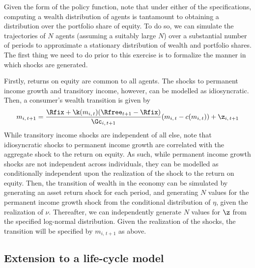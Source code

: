 Given the form of the policy function, note that under either of the specifications, computing a wealth distribution of agents is tantamount to obtaining a distribution over the portfolio share of equity. To do so, we can simulate the trajectories of $N$ agents (assuming a suitably large $N$) over a substantial number of periods to approximate a stationary distribution of wealth and portfolio shares. The first thing we need to do prior to this exercise is to formalize the manner in which shocks are generated.

Firstly, returns on equity are common to all agents. The shocks to permanent income growth and transitory income, however, can be modelled as idiosyncratic. Then, a consumer's wealth transition is given by
\[
m_{i,\,t+1} = \frac{\Rfix + \k(m_{i,\,t})(\Rfree_{t+1} - \Rfix)}{\Gc_{i,\,t+1}}(m_{i,\,t} - c(m_{i,\,t})) + \z_{i,\,t+1}
\]
While transitory income shocks are independent of all else, note that idiosyncratic shocks to permanent income growth are correlated with the aggregate shock to the return on equity. As such, while permanent income growth shocks are not independent across individuals, they can be modelled as conditionally independent upon the realization of the shock to the return on equity. Then, the transition of wealth in the economy can be simulated by generating an asset return shock for each period, and generating $N$ values for the permanent income growth shock from the conditional distribution of $\eta$, given the realization of $\nu$. Thereafter, we can independently generate $N$ values for $\z$ from the specified log-normal distribution. Given the realization of the shocks, the transition will be specified by $m_{i,\,t+1}$ as above.

\subsection{Extension to a life-cycle model}

